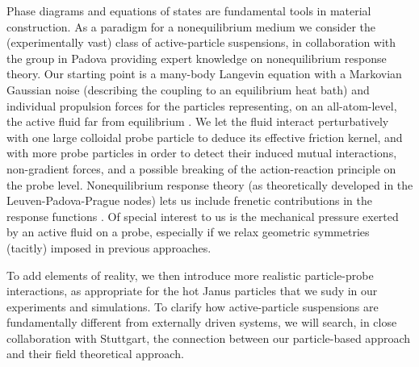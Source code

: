 \begin{workpackage}[id=WPactive,wphases=0-48,
  short=Active Particle Suspensions,%
  title=Probing active particle suspensions with colloids and polymers,
  lead=ULEI,
  ULEIRM=96,UNIPDRM=6,USTUTTRM=2]
\begin{tasklist}
\begin{task}[title=Nonequilibrium equations of state (NEOS),id=task1,PM=8,lead=ULEI,partners={UNIPD,USTUTT},
wphases=0-48!0.5]
Phase diagrams and equations of states are fundamental tools in material construction.
As a paradigm for a nonequilibrium medium we consider the (experimentally vast) class of
active-particle suspensions, in collaboration with the group in Padova providing expert knowledge on 
nonequilibrium response theory.
%
Our starting point is a many-body Langevin equation with a Markovian Gaussian noise
(describing the coupling to an equilibrium heat bath) and individual propulsion forces for
the particles representing, on an all-atom-level, the active fluid far from equilibrium \cite{solon-etal:2015}. 
%
We let the fluid interact perturbatively with one large colloidal probe particle to
deduce its effective friction kernel, and with more probe particles in order to
detect their induced mutual interactions, non-gradient forces, and a possible breaking of
the action-reaction principle on the probe level.  
%
Nonequilibrium response theory (as theoretically developed in the Leuven-Padova-Prague nodes) lets us include frenetic contributions in the response
functions \cite{baiesi-wynants:2009}.
%
Of special interest to us is the mechanical pressure exerted by an active fluid on a probe,
especially if we relax geometric symmetries (tacitly) imposed in previous approaches.

To add elements of reality, we then introduce more realistic particle-probe interactions, as appropriate for the hot
Janus particles that we sudy in our experiments and simulations.
%
To clarify how active-particle suspensions are fundamentally different from externally driven systems,
we will search, in close collaboration with Stuttgart, the connection between our particle-based approach 
and their field theoretical approach.

\end{task}


\end{tasklist}
\end{workpackage}
